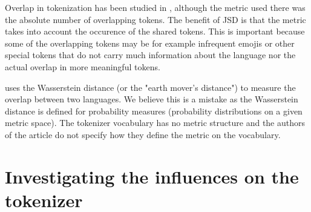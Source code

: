 Overlap in tokenization has been studied in \citet{wu_beto_2019}, although the metric used there was the absolute number of overlapping tokens. The benefit of JSD is that the metric takes into account the occurence of the shared tokens. This is important because some of the overlapping tokens may be for example infrequent emojis or other special tokens that do not carry much information about the language nor the actual overlap in more meaningful tokens.

\citet{chung_improving_2020} uses the Wasserstein distance (or the "earth mover's distance") to measure the overlap between two languages. We believe this is a mistake as the Wasserstein distance is defined for probability measures (probability distributions on a given metric space). The tokenizer vocabulary has no metric structure and the authors of the article do not specify how they define the metric on the vocabulary.







\section{Investigating the influences on the tokenizer}


